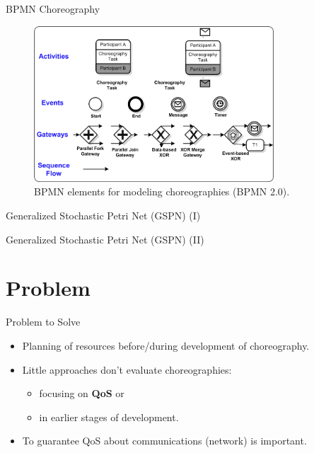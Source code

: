 \documentclass[xcolor=svgnames]{beamer}
\begin{document}
  \begin{frame}{BPMN Choreography}
    
    \begin{figure}[!h]
	      \centering
	      \includegraphics[width=0.8\textwidth]{BPMNBasicChoroegraphy.png}
	      \caption{BPMN elements for modeling choreographies (BPMN 2.0).}
      \end{figure}	 
  \end{frame}
  
  \begin{frame}{ Generalized Stochastic Petri Net (GSPN) (I)}
   
  \end{frame}

  \begin{frame}{ Generalized Stochastic Petri Net (GSPN) (II)}
   
  \end{frame}
\section{Problem}


    \begin{frame}{Problem to Solve}
    	\begin{itemize}
          \item <1-> Planning of resources before/during development of choreography.
          \item <2-> Little approaches don't evaluate choreographies:
	    \begin{itemize}
	      \item focusing on \textbf{QoS} or
	      \item in earlier stages of development.
	    \end{itemize}
          \item <3-> To guarantee QoS about communications (network) is important. 
    	\end{itemize}
    \end{frame}
\end{document}
